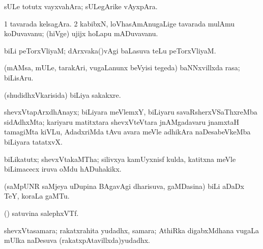 {{{{{{\bentry
{}
 \gl{\nA}\bmng
{} 
\emng
\eentry

\bentry
{}
 \gl{\nA}\bmng
sULe totutx vayxvahAra; sULegArike vAyxpAra. 
\emng
\eentry

\bentry
{}
  \gl{\nA}\bmng
\bnum
\num{1} tavarada kelsagAra. 
\num{2} kabibxN, loVhasAmAnugaLige tavarada mulAmu koDuvavanu; (hiVge) ujijx hoLapu mADuvavanu. 
\enum
\emng
\eentry

\bentry
{}
 \gl{\nA}\bmng
{} 
\emng
\eentry

\bentry
{}
 \gl{\nA}\bmng
biLi peTorxVliyaM; dArxvaka(\mo)vAgi baLasuva teLu peTorxVliyaM. 
\emng
\eentry

\bentry
{}
 \gl{\nA}\bmng
(mAMsa, mULe, tarakAri, \mo vugaLanunx beVyisi tegeda) baNNxvillxda rasa; biLisAru. 
\emng
\eentry

\bentry
{}
 \gl{\nA}\bmng
(shudidhxVkarisida) biLiya sakakxre. 
\emng
\eentry

\bentry
{}
 \gl{\nA}\bmng
shevxVtapArxdhAnayx; biLiyara meVlemxY, biLiyaru savaRsherxVSaThxreMba sidAdhxMta; kariyaru matitxtara shevxVteVtara jnAMgadavaru jnamxtaH tamagiMta kiVLu, AdadxriMda tAvu avara meVle adhikAra naDesabeVkeMba biLiyara tatatxvX. 
\emng
\eentry

\bentry
{}
  \gl{\nA}\bmng
{} 
\emng
\eentry

\bentry
{}
  \gl{\nA}\bmng
biLikatutx; shevxVtakaMTha; silivxya kamUyxnisf kulda, katitxna meVle biLimacecx iruva oMdu hADuhakikx. 
\emng
\eentry

\bentry
{}
 \gl{\nA}\bmng
(saMpUNR saMjeya uDupina BAgavAgi dharisuva, gaMDasina) biLi aDaDx TeY, koraLa gaMTu. 
\emng
\eentry

\bentry
{}
 \gl{\nA}\bmng
(\ravi) satuvina salephxVTf. 
\emng
\eentry

\bentry
{}
 \gl{\nA}\bmng
shevxVtasamara; rakatxrahita yudadhx, samara; AthiRka digabxMdhana \mo vugaLa mUlka naDesuva (rakatxpAtavillxda)yudadhx. 
\emng
\eentry

}}}}}}
